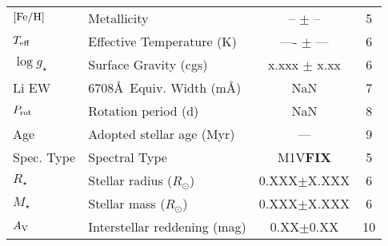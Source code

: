 \begin{table*}
\begin{tabular}{llcc}
%
${\rm [Fe/H]}$\dotfill &   Metallicity \hspace{9pt}\dotfill & -- $\pm$ -- & 5 \\
$T_{\rm eff}$\dotfill &  Effective Temperature (K) \hspace{9pt}\dotfill & ---- $\pm$ --- &  6  \\
$\log{g_{\star}}$\dotfill &  Surface Gravity (cgs)\hspace{9pt}\dotfill &  x.xxx $\pm$ x.xx  &  6 \\
%
Li EW\dotfill & 6708\AA\ Equiv{.} Width (m\AA) \dotfill & NaN  & 7 \\
%
$P_{\rm rot}$\dotfill & Rotation period (d)\dotfill & NaN  & 8 \\
Age & Adopted stellar age (Myr)\dotfill & ---  &  9 \\
%
Spec. Type\dotfill & Spectral Type\dotfill & 	M1V{\bf FIX} & 5 \\
%
$R_\star$\dotfill & Stellar radius ($R_\odot$)\dotfill & 0.XXX$\pm$X.XXX & 6 \\
$M_\star$\dotfill & Stellar mass ($R_\odot$)\dotfill & 0.XXX$\pm$X.XXX & 6 \\
$A_{\rm V}$\dotfill & Interstellar reddening (mag)\dotfill & 0.XX$\pm$0.XX & 10 \\

\end{tabular}
\end{table*}

